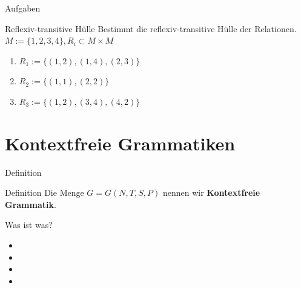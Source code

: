 	\begin{frame}{Aufgaben}
  		\begin{exampleblock}{Reflexiv-transitive Hülle}
    		Bestimmt die reflexiv-transitive Hülle der Relationen.\\
    		$M := \{1, 2, 3, 4\}, R_i \subset M \times M$
    		\begin{enumerate}
      			\item $R_1 := \{(1, 2), (1, 4), (2, 3)\}$
      			\item $R_2 := \{(1, 1), (2, 2)\}$
      			\item $R_3 := \{(1, 2), (3, 4), (4, 2)\}$
    		\end{enumerate}
  		\end{exampleblock}
  		\pause
  		
\end{frame}
	
	
	\section{Kontextfreie Grammatiken}
	\begin{frame}{Definition}
		\begin{block}{Definition}
        	Die Menge $G = G \left( N, T, S, P \right)$ nennen wir 
        	\textbf{Kontextfreie Grammatik}.
    	\end{block}
    	\pause
        \begin{block}{Was ist was?}
            \begin{itemize}
                \item {}
                \item {}
                \item {}
                \item {}
            \end{itemize}
    	\end{block}
	\end{frame}
	
